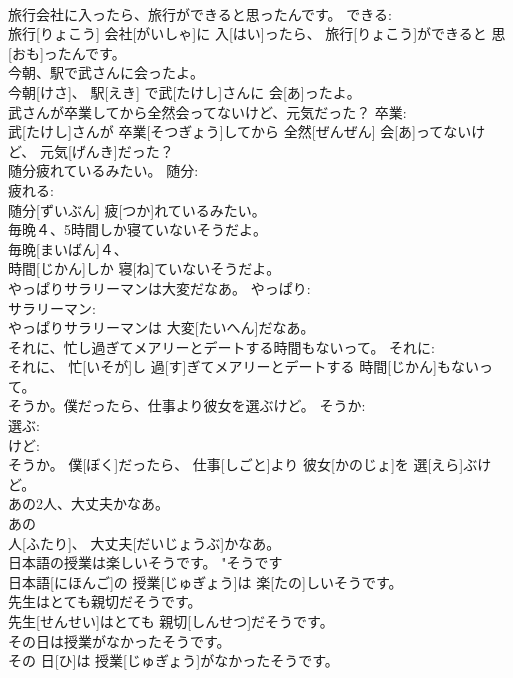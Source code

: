 \documentclass[8pt]{extreport}
\begin{document}
\begin{CJK}{UTF8}{min}
\\	旅行会社に入ったら、旅行ができると思ったんです。	できる: 
\\	旅行[りょこう] 会社[がいしゃ]に 入[はい]ったら、 旅行[りょこう]ができると 思[おも]ったんです。	
\\	今朝、駅で武さんに会ったよ。	
\\	今朝[けさ]、 駅[えき] で武[たけし]さんに 会[あ]ったよ。	
\\	武さんが卒業してから全然会ってないけど、元気だった？	卒業: 
\\	武[たけし]さんが 卒業[そつぎょう]してから 全然[ぜんぜん] 会[あ]ってないけど、 元気[げんき]だった？	
\\	随分疲れているみたい。	随分: 
\\	疲れる: 
\\	随分[ずいぶん] 疲[つか]れているみたい。	
\\	毎晩４、5時間しか寝ていないそうだよ。	
\\	毎晩[まいばん]４、 
\\	時間[じかん]しか 寝[ね]ていないそうだよ。	
\\	やっぱりサラリーマンは大変だなあ。	やっぱり: 
\\	サラリーマン: 
\\	やっぱりサラリーマンは 大変[たいへん]だなあ。	
\\	それに、忙し過ぎてメアリーとデートする時間もないって。	それに: 
\\	それに、 忙[いそが]し 過[す]ぎてメアリーとデートする 時間[じかん]もないって。	
\\	そうか。僕だったら、仕事より彼女を選ぶけど。	そうか: 
\\	選ぶ: 
\\	けど: 
\\	そうか。 僕[ぼく]だったら、 仕事[しごと]より 彼女[かのじょ]を 選[えら]ぶけど。	
\\	あの2人、大丈夫かなあ。	
\\	あの 
\\	人[ふたり]、 大丈夫[だいじょうぶ]かなあ。	
\\	日本語の授業は楽しいそうです。	"そうです 
\\	日本語[にほんご]の 授業[じゅぎょう]は 楽[たの]しいそうです。	
\\	先生はとても親切だそうです。	
\\	先生[せんせい]はとても 親切[しんせつ]だそうです。	
\\	その日は授業がなかったそうです。	
\\	その 日[ひ]は 授業[じゅぎょう]がなかったそうです。	

\end{CJK}
\end{document}
